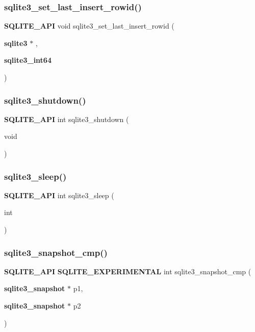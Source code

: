 \mbox{\label{sqlite3_8h_a4a0a92ec033492e31d1a9fd416e14c23}} 
\subsubsection{sqlite3\_set\_last\_insert\_rowid()}
{\footnotesize\ttfamily \textbf{ S\+Q\+L\+I\+T\+E\+\_\+\+A\+PI} void sqlite3\+\_\+set\+\_\+last\+\_\+insert\+\_\+rowid (\begin{DoxyParamCaption}\item[{\textbf{ sqlite3} $\ast$}]{,  }\item[{\textbf{ sqlite3\+\_\+int64}}]{ }\end{DoxyParamCaption})}

\mbox{\label{sqlite3_8h_aeaf9947fe863ba3d3aca061475e3af2e}} 
\subsubsection{sqlite3\_shutdown()}
{\footnotesize\ttfamily \textbf{ S\+Q\+L\+I\+T\+E\+\_\+\+A\+PI} int sqlite3\+\_\+shutdown (\begin{DoxyParamCaption}\item[{void}]{ }\end{DoxyParamCaption})}

\mbox{\label{sqlite3_8h_ad0c133ddbbecb6433f3c6ebef8966efa}} 
\subsubsection{sqlite3\_sleep()}
{\footnotesize\ttfamily \textbf{ S\+Q\+L\+I\+T\+E\+\_\+\+A\+PI} int sqlite3\+\_\+sleep (\begin{DoxyParamCaption}\item[{int}]{ }\end{DoxyParamCaption})}

\mbox{\label{sqlite3_8h_a62bb82f183068690c78e78adfcf7878c}} 
\subsubsection{sqlite3\_snapshot\_cmp()}
{\footnotesize\ttfamily \textbf{ S\+Q\+L\+I\+T\+E\+\_\+\+A\+PI} \textbf{ S\+Q\+L\+I\+T\+E\+\_\+\+E\+X\+P\+E\+R\+I\+M\+E\+N\+T\+AL} int sqlite3\+\_\+snapshot\+\_\+cmp (\begin{DoxyParamCaption}\item[{\textbf{ sqlite3\+\_\+snapshot} $\ast$}]{p1,  }\item[{\textbf{ sqlite3\+\_\+snapshot} $\ast$}]{p2 }\end{DoxyParamCaption})}

